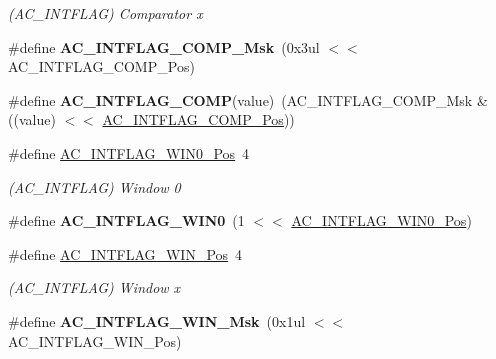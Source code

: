 \begin{DoxyCompactItemize}
\begin{DoxyCompactList}\small\item\em (A\+C\+\_\+\+I\+N\+T\+F\+L\+A\+G) Comparator x \end{DoxyCompactList}\item 
\hypertarget{group___s_a_m_l21___a_c_ga0b0b6bcb614e027f81546f4145b07242}{}\#define {\bfseries A\+C\+\_\+\+I\+N\+T\+F\+L\+A\+G\+\_\+\+C\+O\+M\+P\+\_\+\+Msk}~(0x3ul $<$$<$ A\+C\+\_\+\+I\+N\+T\+F\+L\+A\+G\+\_\+\+C\+O\+M\+P\+\_\+\+Pos)\label{group___s_a_m_l21___a_c_ga0b0b6bcb614e027f81546f4145b07242}

\item 
\hypertarget{group___s_a_m_l21___a_c_gaeaa4d63013e1a35f3528cfaa354cff1e}{}\#define {\bfseries A\+C\+\_\+\+I\+N\+T\+F\+L\+A\+G\+\_\+\+C\+O\+M\+P}(value)~(A\+C\+\_\+\+I\+N\+T\+F\+L\+A\+G\+\_\+\+C\+O\+M\+P\+\_\+\+Msk \& ((value) $<$$<$ \hyperlink{group___s_a_m_l21___a_c_ga5ec6d9f6399298e5873a182d7c171cd6}{A\+C\+\_\+\+I\+N\+T\+F\+L\+A\+G\+\_\+\+C\+O\+M\+P\+\_\+\+Pos}))\label{group___s_a_m_l21___a_c_gaeaa4d63013e1a35f3528cfaa354cff1e}

\item 
\hypertarget{group___s_a_m_l21___a_c_ga9db46160e34e14edd76900fd5f8420f3}{}\#define \hyperlink{group___s_a_m_l21___a_c_ga9db46160e34e14edd76900fd5f8420f3}{A\+C\+\_\+\+I\+N\+T\+F\+L\+A\+G\+\_\+\+W\+I\+N0\+\_\+\+Pos}~4\label{group___s_a_m_l21___a_c_ga9db46160e34e14edd76900fd5f8420f3}

\begin{DoxyCompactList}\small\item\em (A\+C\+\_\+\+I\+N\+T\+F\+L\+A\+G) Window 0 \end{DoxyCompactList}\item 
\hypertarget{group___s_a_m_l21___a_c_ga2d545125f06ba57019482f0945205252}{}\#define {\bfseries A\+C\+\_\+\+I\+N\+T\+F\+L\+A\+G\+\_\+\+W\+I\+N0}~(1 $<$$<$ \hyperlink{group___s_a_m_l21___a_c_ga9db46160e34e14edd76900fd5f8420f3}{A\+C\+\_\+\+I\+N\+T\+F\+L\+A\+G\+\_\+\+W\+I\+N0\+\_\+\+Pos})\label{group___s_a_m_l21___a_c_ga2d545125f06ba57019482f0945205252}

\item 
\hypertarget{group___s_a_m_l21___a_c_gab8feb07a41c8519472bce0d6b09d568d}{}\#define \hyperlink{group___s_a_m_l21___a_c_gab8feb07a41c8519472bce0d6b09d568d}{A\+C\+\_\+\+I\+N\+T\+F\+L\+A\+G\+\_\+\+W\+I\+N\+\_\+\+Pos}~4\label{group___s_a_m_l21___a_c_gab8feb07a41c8519472bce0d6b09d568d}

\begin{DoxyCompactList}\small\item\em (A\+C\+\_\+\+I\+N\+T\+F\+L\+A\+G) Window x \end{DoxyCompactList}\item 
\hypertarget{group___s_a_m_l21___a_c_gaffd6b3fa5bd9b71b4ccce3fb652b5539}{}\#define {\bfseries A\+C\+\_\+\+I\+N\+T\+F\+L\+A\+G\+\_\+\+W\+I\+N\+\_\+\+Msk}~(0x1ul $<$$<$ A\+C\+\_\+\+I\+N\+T\+F\+L\+A\+G\+\_\+\+W\+I\+N\+\_\+\+Pos)\label{group___s_a_m_l21___a_c_gaffd6b3fa5bd9b71b4ccce3fb652b5539}


\end{DoxyCompactItemize}
